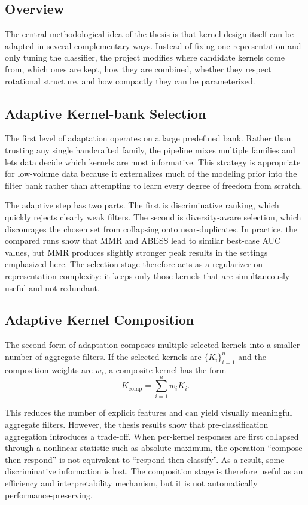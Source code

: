 \documentclass{cernatsnote}
\let\oldsubsection\subsection
\let\oldsubsubsection\subsubsection
\let\section\oldsubsection
\let\subsection\oldsubsubsection
\begin{document}
\section{Overview}
The central methodological idea of the thesis is that kernel design itself can be adapted in several complementary ways. Instead of fixing one representation and only tuning the classifier, the project modifies where candidate kernels come from, which ones are kept, how they are combined, whether they respect rotational structure, and how compactly they can be parameterized.

\section{Adaptive Kernel-bank Selection}
The first level of adaptation operates on a large predefined bank. Rather than trusting any single handcrafted family, the pipeline mixes multiple families and lets data decide which kernels are most informative. This strategy is appropriate for low-volume data because it externalizes much of the modeling prior into the filter bank rather than attempting to learn every degree of freedom from scratch.

The adaptive step has two parts. The first is discriminative ranking, which quickly rejects clearly weak filters. The second is diversity-aware selection, which discourages the chosen set from collapsing onto near-duplicates. In practice, the compared runs show that MMR and ABESS lead to similar best-case AUC values, but MMR produces slightly stronger peak results in the settings emphasized here. The selection stage therefore acts as a regularizer on representation complexity: it keeps only those kernels that are simultaneously useful and not redundant.

\section{Adaptive Kernel Composition}
The second form of adaptation composes multiple selected kernels into a smaller number of aggregate filters. If the selected kernels are $\{K_i\}_{i=1}^n$ and the composition weights are $w_i$, a composite kernel has the form
\[
K_{\text{comp}} = \sum_{i=1}^{n} w_i K_i.
\]

This reduces the number of explicit features and can yield visually meaningful aggregate filters. However, the thesis results show that pre-classification aggregation introduces a trade-off. When per-kernel responses are first collapsed through a nonlinear statistic such as absolute maximum, the operation ``compose then respond'' is not equivalent to ``respond then classify''. As a result, some discriminative information is lost. The composition stage is therefore useful as an efficiency and interpretability mechanism, but it is not automatically performance-preserving.
\end{document}
